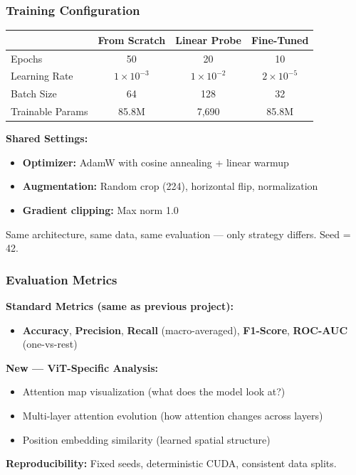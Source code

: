 \documentclass[aspectratio=169]{beamer}
\begin{document}
\begin{frame}
    \frametitle{Training Configuration}
    \small
    \begin{table}
        \centering
        \begin{tabular}{lccc}
            \toprule
            & \textbf{From Scratch} & \textbf{Linear Probe} & \textbf{Fine-Tuned} \\
            \midrule
            Epochs & 50 & 20 & 10 \\
            Learning Rate & $1 \times 10^{-3}$ & $1 \times 10^{-2}$ & $2 \times 10^{-5}$ \\
            Batch Size & 64 & 128 & 32 \\
            Trainable Params & 85.8M & 7,690 & 85.8M \\
            \bottomrule
        \end{tabular}
    \end{table}

    \textbf{Shared Settings:}
    \begin{itemize}
        \item \textbf{Optimizer:} AdamW with cosine annealing + linear warmup
        \item \textbf{Augmentation:} Random crop (224), horizontal flip, normalization
        \item \textbf{Gradient clipping:} Max norm 1.0
    \end{itemize}
    {\footnotesize Same architecture, same data, same evaluation --- only strategy differs. Seed = 42.}
\end{frame}

\begin{frame}
    \frametitle{Evaluation Metrics}
    \small
    \textbf{Standard Metrics (same as previous project):}
    \begin{itemize}
        \item \textbf{Accuracy}, \textbf{Precision}, \textbf{Recall} (macro-averaged), \textbf{F1-Score}, \textbf{ROC-AUC} (one-vs-rest)
    \end{itemize}

    \vspace{0.1cm}

    \textbf{New --- ViT-Specific Analysis:}
    \begin{itemize}
        \item Attention map visualization (what does the model look at?)
        \item Multi-layer attention evolution (how attention changes across layers)
        \item Position embedding similarity (learned spatial structure)
    \end{itemize}

    \vspace{0.1cm}
    {\footnotesize \textbf{Reproducibility:} Fixed seeds, deterministic CUDA, consistent data splits.}
\end{frame}
\end{document}
